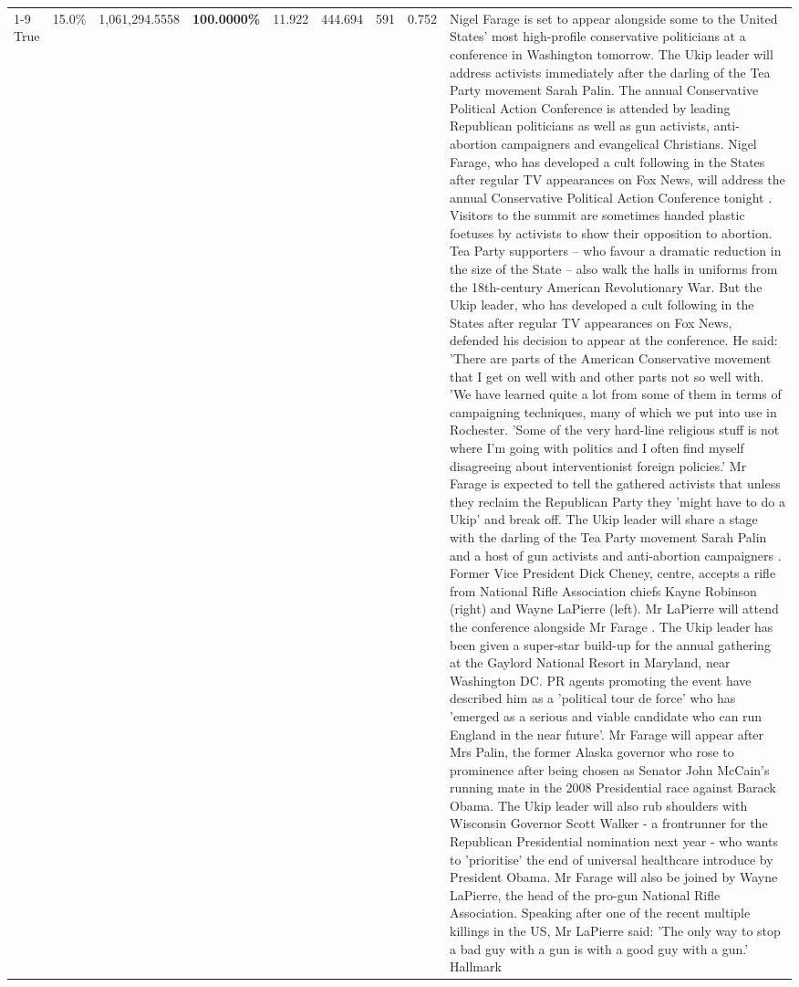 \begin{table}[H]
\begin{tabular}{lllrlllll}
\cline{1-9}
True & 15.0\% & 1,061,294.5558 & \bfseries \color{red} 100.0000\% & 11.922 & 444.694 & 591 & 0.752 & Nigel Farage is set to appear alongside some to the United States' most high-profile conservative politicians at a conference in Washington tomorrow. The Ukip leader will address activists immediately after the darling of the Tea Party movement Sarah Palin. The annual Conservative Political Action Conference is attended by leading Republican politicians as well as gun activists, anti-abortion campaigners and evangelical Christians. Nigel Farage, who has developed a cult following in the States after regular TV appearances on Fox News, will address the annual Conservative Political Action Conference tonight . Visitors to the summit are sometimes handed plastic foetuses by activists to show their opposition to abortion. Tea Party supporters – who favour a dramatic reduction in the size of the State – also walk the halls in uniforms from the 18th-century American Revolutionary War. But the Ukip leader, who has developed a cult following in the States after regular TV appearances on Fox News, defended his decision to appear at the conference. He said: 'There are parts of the American Conservative movement that I get on well with and other parts not so well with. 'We have learned quite a lot from some of them in terms of campaigning techniques, many of which we put into use in Rochester. 'Some of the very hard-line religious stuff is not where I'm going with politics and I often find myself disagreeing about interventionist foreign policies.' Mr Farage is expected to tell the gathered activists that unless they reclaim the Republican Party they 'might have to do a Ukip' and break off. The Ukip leader will share a stage with the darling of the Tea Party movement Sarah Palin and a host of gun activists and anti-abortion campaigners . Former Vice President Dick Cheney, centre, accepts a rifle from National Rifle Association chiefs Kayne Robinson (right) and Wayne LaPierre (left). Mr LaPierre will attend the conference alongside Mr Farage . The Ukip leader has been given a super-star build-up for the annual gathering at the Gaylord National Resort in Maryland, near Washington DC. PR agents promoting the event have described him as a 'political tour de force' who has 'emerged as a serious and viable candidate who can run England in the near future'. Mr Farage will appear after Mrs Palin, the former Alaska governor who rose to prominence after being chosen as Senator John McCain's running mate in the 2008 Presidential race against Barack Obama. The Ukip leader will also rub shoulders with Wisconsin Governor Scott Walker - a frontrunner for the Republican Presidential nomination next year - who wants to 'prioritise' the end of universal healthcare introduce by President Obama. Mr Farage will also be joined by Wayne LaPierre, the head of the pro-gun National Rifle Association. Speaking after one of the recent multiple killings in the US, Mr LaPierre said: 'The only way to stop a bad guy with a gun is with a good guy with a gun.' Hallmark \\

\end{tabular}
\end{table}
